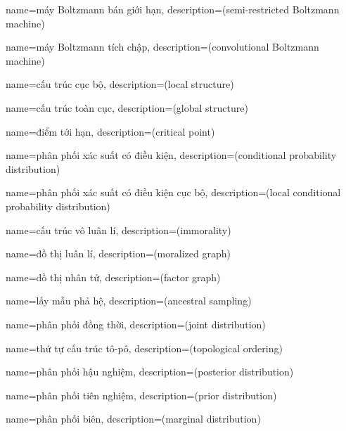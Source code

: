 
{
    name={máy Boltzmann bán giới hạn},
    description={(semi-restricted Boltzmann machine)}
}

{
    name={máy Boltzmann tích chập},
    description={(convolutional Boltzmann machine)}
}

{
    name={cấu trúc cục bộ},
    description={(local structure)}
}

{
    name={cấu trúc toàn cục},
    description={(global structure)}
}

{
    name={điểm tới hạn},
    description={(critical point)}
}

{
    name={phân phối xác suất có điều kiện},
    description={(conditional probability distribution)}
}

{
    name={phân phối xác suất có điều kiện cục bộ},
    description={(local conditional probability distribution)}
}

{
    name={cấu trúc vô luân lí},
    description={(immorality)}
}

{
    name={đồ thị luân lí},
    description={(moralized graph)}
}

{
    name={đồ thị nhân tử},
    description={(factor graph)}
}

{
    name={lấy mẫu phả hệ},
    description={(ancestral sampling)}
}

{
    name={phân phối đồng thời},
    description={(joint distribution)}
}

{
    name={thứ tự cấu trúc tô-pô},
    description={(topological ordering)}
}

{
    name={phân phối hậu nghiệm},
    description={(posterior distribution)}
}

{
    name={phân phối tiên nghiệm},
    description={(prior distribution)}
}

{
    name={phân phối biên},
    description={(marginal distribution)}
}

